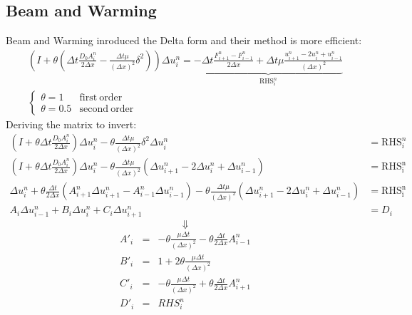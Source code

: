 \documentclass[11pt, a4paper]{article}
\begin{document}
\subsection{Beam and Warming}
Beam and Warming inroduced the Delta form and their method is more efficient:
\begin{equation}
    \begin{array}{c}
        \displaystyle\left(I+\theta\left(\Delta t\frac{D_0A_i^n}{2\Delta x}-\frac{\Delta t\mu}{\left(\Delta x\right)^2}\delta^2\right)\right)\Delta u_i^n=\underbrace{-\Delta t\frac{F_{i+1}^n-F_{i-1}^n}{2\Delta x}+\Delta t\mu\frac{u^n_{i+1}-2u^n_i+u^n_{i-1}}{\left(\Delta x\right)^2}}_{\displaystyle\mathrm{RHS}_i^n} \\
        \left\{\begin{array}{ll}
            \theta=1 & \mathrm{first\ order} \\
            \theta=0.5 & \mathrm{second\ order}
        \end{array}\right.
    \end{array}
\end{equation}
Deriving the matrix to invert:
\begin{align*}
    \displaystyle\left(I+\theta\Delta t\frac{D_0A_i^n}{2\Delta x}\right)\Delta u_i^n-\theta\frac{\Delta t\mu}{\left(\Delta x\right)^2}\delta^2\Delta u^n_i&=\mathrm{RHS}^n_i\\
    \displaystyle\left(I+\theta\Delta t\frac{D_0A_i^n}{2\Delta x}\right)\Delta u_i^n-\theta\frac{\Delta t\mu}{\left(\Delta x\right)^2}\left(\Delta u^n_{i+1}-2\Delta u^n_i+\Delta u^n_{i-1}\right)&=\mathrm{RHS_i^n} \\
    \displaystyle\Delta u_i^n+\theta\frac{\Delta t}{2\Delta x}\left(A_{i+1}^n\Delta u_{i+1}^n-A_{i-1}^n\Delta u_{i-1}^n\right)-\theta\frac{\Delta t\mu}{\left(\Delta x\right)^2}\left(\Delta u^n_{i+1}-2\Delta u^n_i+\Delta u^n_{i-1}\right)&=\mathrm{RHS_i^n} \\
    A_i\Delta u^n_{i-1}+B_i\Delta u^n_i+C_i\Delta u^n_{i+1}&=D_i
\end{align*}
\begin{equation*}
    \Downarrow
\end{equation*}
\begin{equation}
    \begin{array}{lcl}
        A'_i &=& \displaystyle-\theta\frac{\mu\Delta t}{\left(\Delta x\right)^2}-\theta\frac{\Delta t}{2\Delta x}A_{i-1}^n\\
        B'_i &=& \displaystyle1+2\theta\frac{\mu\Delta t}{\left(\Delta x\right)^2}\\
        C'_i &=& \displaystyle-\theta\frac{\mu\Delta t}{\left(\Delta x\right)^2}+\theta\frac{\Delta t}{2\Delta x}A_{i+1}^n\\
        D'_i &=& RHS_i^n
    \end{array}
\end{equation}
\end{document}
